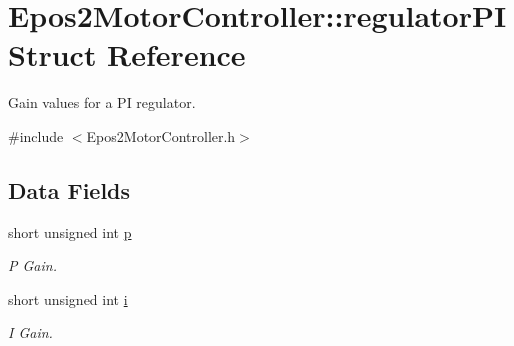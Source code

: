 \hypertarget{structEpos2MotorController_1_1regulatorPI}{\section{Epos2\-Motor\-Controller\-:\-:regulator\-P\-I Struct Reference}
\label{structEpos2MotorController_1_1regulatorPI}
}


Gain values for a P\-I regulator.  




{\ttfamily \#include $<$Epos2\-Motor\-Controller.\-h$>$}

\subsection*{Data Fields}
\begin{DoxyCompactItemize}
\item 
\hypertarget{structEpos2MotorController_1_1regulatorPI_a300d2fe89b9ecf204294ce957967f0f8}{short unsigned int \hyperlink{structEpos2MotorController_1_1regulatorPI_a300d2fe89b9ecf204294ce957967f0f8}{p}}\label{structEpos2MotorController_1_1regulatorPI_a300d2fe89b9ecf204294ce957967f0f8}

\begin{DoxyCompactList}\small\item\em P Gain. \end{DoxyCompactList}\item 
\hypertarget{structEpos2MotorController_1_1regulatorPI_ab78a305f3015c88a455991a1345123bb}{short unsigned int \hyperlink{structEpos2MotorController_1_1regulatorPI_ab78a305f3015c88a455991a1345123bb}{i}}\label{structEpos2MotorController_1_1regulatorPI_ab78a305f3015c88a455991a1345123bb}

\begin{DoxyCompactList}\small\item\em I Gain. \end{DoxyCompactList}\end{DoxyCompactItemize}
